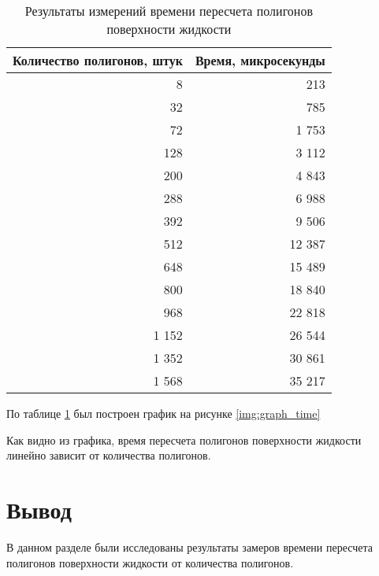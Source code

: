 \begin{table}[H]
\caption{\label{tbl:time}Результаты измерений времени пересчета полигонов поверхности жидкости}
\centering
\begin{tabular}{|r|r|}
\hline
Количество полигонов, штук & Время, микросекунды \\ \hline
8    &    213 \\ \hline
32   &    785 \\ \hline
72   &  1 753 \\ \hline
128  &  3 112 \\ \hline
200  &  4 843 \\ \hline
288  &  6 988 \\ \hline
392  &  9 506 \\ \hline
512  &  12 387 \\ \hline
648  &  15 489 \\ \hline
800  &  18 840 \\ \hline
968  &  22 818 \\ \hline
1 152 &  26 544 \\ \hline
1 352 &  30 861 \\ \hline
1 568 &  35 217 \\ \hline
\end{tabular}
\end{table}

По таблице \ref{tbl:time} был построен график на рисунке \ref{img:graph_time}


\newpage

Как видно из графика, время пересчета полигонов поверхности жидкости линейно зависит от количества полигонов.

\section*{Вывод}

В данном разделе были исследованы результаты замеров времени пересчета полигонов поверхности жидкости от количества полигонов.

